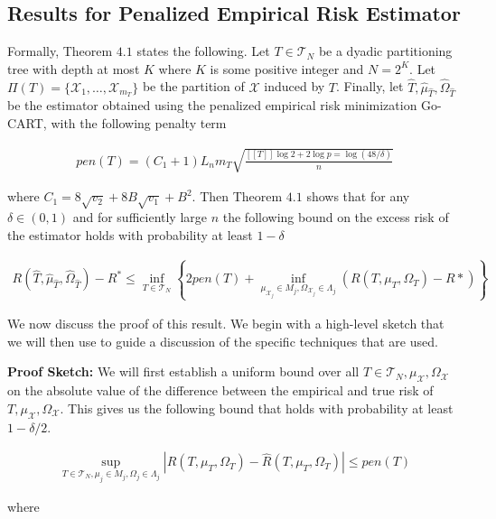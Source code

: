 \subsection{Results for Penalized Empirical Risk Estimator}

Formally, Theorem $4.1$ states the following. Let $T \in
\mathcal{T}_N$ be a dyadic partitioning tree with depth at most $K$
where $K$ is some positive integer and $N = 2^K$. Let $\Pi(T) =
\{\mathcal{X}_1, \ldots, \mathcal{X}_{m_T}\}$ be the partition of
$\mathcal{X}$ induced by $T$. Finally, let $\hat{T},
\hat{\mu}_{\hat{T}}, \hat{\Omega}_{\hat{T}}$ be the estimator obtained
using the penalized empirical risk minimization Go-CART, with the
following penalty term

\begin{align}
  pen(T) = (C_1 + 1) L_n m_T \sqrt{\frac{[[T]] \log 2 + 2 \log p = \log(48/\delta)}{n}}
\end{align}

where $C_1 = 8 \sqrt{v_2} + 8 B \sqrt{v_1} + B^2$. Then Theorem $4.1$
shows that for any $\delta \in (0, 1)$ and for sufficiently large $n$
the following bound on the excess risk of the estimator holds with
probability at least $1-\delta$

\begin{align}
  R(\hat{T}, \hat{\mu}_{\hat{T}}, \hat{\Omega}_{\hat{T}}) - R^*
  \le \inf_{T \in \mathcal{T}_N} \left\{
    2 pen(T) + \inf_{\mu_{\mathcal{X}_j} \in M_j, \Omega_{\mathcal{X}_j} \in \Lambda_j}
    (R(T, \mu_T, \Omega_T) - R*)
  \right\}
\end{align}

We now discuss the proof of this result. We begin with a high-level
sketch that we will then use to guide a discussion of the specific
techniques that are used.

\textbf{Proof Sketch:} We will first establish a uniform bound over
all $T \in \mathcal{T}_N, \mu_{\mathcal{X}}, \Omega_{\mathcal{X}}$ on
the absolute value of the difference between the empirical and true
risk of $T, \mu_{\mathcal{X}}, \Omega_{\mathcal{X}}$. This gives us
the following bound that holds with probability at least $1 -
\delta/2$.

\begin{align}
  \sup_{T \in \mathcal{T}_N, \mu_j \in M_j, \Omega_j \in \Lambda_j}
  \left|
    R(T, \mu_T, \Omega_T) - \hat{R}(T, \mu_T, \Omega_T)
  \right| \le pen(T)
\end{align}

where

